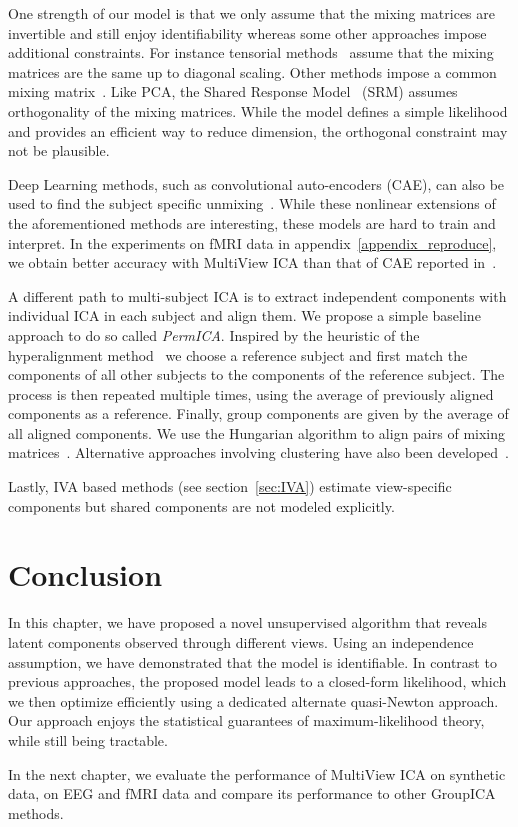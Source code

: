 One strength of our model is that we only assume that the mixing matrices are invertible and still enjoy identifiability whereas some other approaches impose additional constraints. For instance tensorial methods~\cite{beckmann2005tensorial} assume that the mixing matrices are the same up to diagonal scaling.
Other methods impose a common mixing matrix~\cite{cong2013validating, grin2010independent, calhoun2001fmri, Monti18UAI}. Like PCA, the Shared Response Model~\cite{chen2015reduced} (SRM) assumes orthogonality of the mixing matrices. While the model defines a simple likelihood and provides an efficient way to reduce dimension, the orthogonal constraint may not be plausible.

Deep Learning methods, such as convolutional auto-encoders (CAE), can also be used to find the subject specific unmixing~\cite{chen2016convolutional}. While these nonlinear extensions of the aforementioned methods are interesting, these models are hard to train and interpret. In the experiments on fMRI data in appendix~\ref{appendix_reproduce}, we obtain better accuracy with MultiView ICA than that of CAE reported in~\cite{chen2016convolutional}.

A different path to multi-subject ICA is to extract independent components with individual ICA in each subject and align them. We propose a simple baseline approach to do so called \emph{PermICA}.
Inspired by the heuristic of the hyperalignment method~\cite{haxby2011common} we choose a reference subject and first match the components of all other subjects to the components of the reference subject. The process is then repeated multiple times, using the average of previously aligned components as a reference. Finally, group components are given by the average of all aligned components. We use the Hungarian algorithm to align pairs of mixing matrices~\cite{tichavsky2004optimal}.
Alternative approaches involving clustering have also been developed~\cite{esposito2005independent,bigdely2013measure}.

Lastly, IVA based methods (see section~\ref{sec:IVA})
estimate view-specific components but shared components are not modeled explicitly.

\section{Conclusion}
In this chapter, we have proposed a novel unsupervised algorithm that reveals latent components observed through different views. Using an independence assumption, 
we have demonstrated that the model is identifiable.
% 
In contrast to previous approaches, the proposed model leads to a closed-form likelihood, which we then optimize efficiently using a dedicated alternate quasi-Newton approach.
% 
Our approach enjoys the statistical guarantees of maximum-likelihood theory, while still being tractable.
% 

In the next chapter, we evaluate the performance of MultiView ICA on synthetic
data, on EEG and fMRI data and compare its performance to other GroupICA methods.
